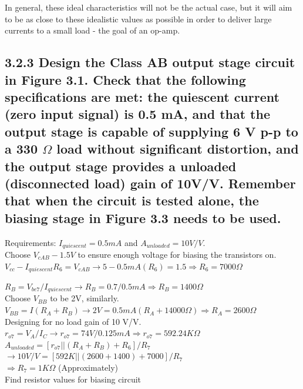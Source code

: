 \documentclass[12pt]{article}
\begin{document}
In general, these ideal characteristics will not be the actual case, but it will aim to be as close to these idealistic values as possible in order to deliver large currents to a small load - the goal of an op-amp.

\subsection*{3.2.3 Design the Class AB output stage circuit in Figure 3.1. Check that the following specifications are met: the quiescent current (zero input signal) is 0.5 mA, and that the output stage is capable of supplying 6 V p-p to a 330 $\Omega$ load without significant distortion, and the output stage provides a unloaded (disconnected load) gain of 10V/V. Remember that when the circuit is tested alone, the biasing stage in Figure 3.3 needs to be used. }

Requirements: $I_{quiescent} = 0.5mA$ and $A_{unloaded} = 10V/V$. \\

Choose $V_{cAB} - 1.5V$ to ensure enough voltage for biasing the transistors on. \\

$V_{cc} - I_{quiescent} R_6 = V_{cAB} \rightarrow 5 - 0.5 mA (R_6) = 1.5 \Rightarrow R_6 = 7000 \Omega$

$R_B = V_{be7} / I_{quiescent} \rightarrow R_B = 0.7 / 0.5 mA \Rightarrow R_B = 1400 \Omega $ \\ 

Choose $V_{BB}$ to be 2V, similarly.\\

$V_{BB} = I (R_A + R_B) \rightarrow 2 V = 0.5mA (R_A + 14000 \Omega) \Rightarrow R_A = 2600 \Omega$ \\

Designing for no load gain of 10 V/V. \\

$r_{o7} = V_A / I_C \rightarrow r_{o7} = 74 V / 0.125 mA \Rightarrow r_{o7} = 592.24K \Omega$ \\

$A_{unloaded} = [ r_{o7} || (R_A + R_B) + R_6 ] / R_7 $ \\

$\rightarrow 10 V/V = [ 592 K || (2600 + 1400) + 7000 ] / R_7$ \\

$\Rightarrow R_7 = 1K \Omega$ (Approximately) \\

Find resistor values for biasing circuit \\
\end{document}

